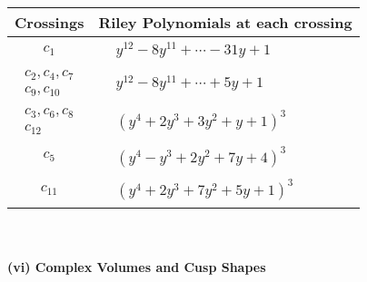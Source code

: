 \documentclass[1p]{elsarticle_modified}
\theoremstyle{definition}
\begin{document}
\begin{tabular}{m{50pt}|m{274pt}}
Crossings & \hspace{64pt}Riley Polynomials at each crossing \\
\hline $$\begin{aligned}c_{1}\end{aligned}$$&$\begin{aligned}
&y^{12}-8 y^{11}+\cdots-31 y+1
\end{aligned}$\\
\hline $$\begin{aligned}c_{2},c_{4},c_{7}\\c_{9},c_{10}\end{aligned}$$&$\begin{aligned}
&y^{12}-8 y^{11}+\cdots+5 y+1
\end{aligned}$\\
\hline $$\begin{aligned}c_{3},c_{6},c_{8}\\c_{12}\end{aligned}$$&$\begin{aligned}
&(y^4+2 y^3+3 y^2+y+1)^3
\end{aligned}$\\
\hline $$\begin{aligned}c_{5}\end{aligned}$$&$\begin{aligned}
&(y^4- y^3+2 y^2+7 y+4)^3
\end{aligned}$\\
\hline $$\begin{aligned}c_{11}\end{aligned}$$&$\begin{aligned}
&(y^4+2 y^3+7 y^2+5 y+1)^3
\end{aligned}$\\
\hline
\end{tabular}\\~\\
\newpage\flushleft \textbf{(vi) Complex Volumes and Cusp Shapes}
\end{document}
